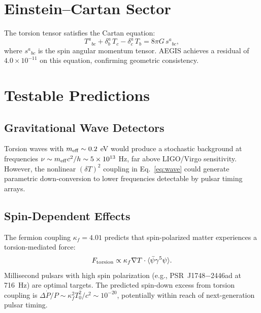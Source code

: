 \documentclass[12pt,preprint]{aastex631}
\begin{document}
\section{Einstein--Cartan Sector}
\label{sec:ec}

The torsion tensor satisfies the Cartan equation:
\begin{equation}
\label{eq:cartan}
  T^a{}_{bc} + \delta^a_b\, T_c - \delta^a_c\, T_b
  = 8\pi G\, s^a{}_{bc},
\end{equation}
where $s^a{}_{bc}$ is the spin angular momentum tensor.
AEGIS achieves a residual of $4.0 \times 10^{-11}$ on this equation,
confirming geometric consistency.

\section{Testable Predictions}
\label{sec:predictions}

\subsection{Gravitational Wave Detectors}

Torsion waves with $m_{\rm eff} \sim 0.2$ eV would produce
a stochastic background at frequencies $\nu \sim m_{\rm eff}c^2/h
\sim 5 \times 10^{13}$ Hz, far above LIGO/Virgo sensitivity.
However, the nonlinear $(\delta T)^2$ coupling in Eq.~\ref{eq:wave}
could generate parametric down-conversion to lower frequencies
detectable by pulsar timing arrays.

\subsection{Spin-Dependent Effects}

The fermion coupling $\kappa_f = 4.01$ predicts that spin-polarized
matter experiences a torsion-mediated force:
\begin{equation}
  F_{\rm torsion} \propto \kappa_f \nabla T \cdot \langle\bar\psi\gamma^5\psi\rangle.
\end{equation}
Millisecond pulsars with high spin polarization
(e.g., PSR~J1748$-$2446ad at 716~Hz) are optimal targets.
The predicted spin-down excess from torsion coupling is
$\Delta\dot{P}/P \sim \kappa_f^2 T_0^2 / c^2 \sim 10^{-20}$,
potentially within reach of next-generation pulsar timing.
\end{document}
